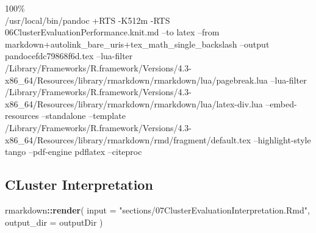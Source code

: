 \documentclass[
]{article}
\newenvironment{Shaded}{\begin{snugshade}}{\end{snugshade}}
\newcommand{\AttributeTok}[1]{\textcolor[rgb]{0.13,0.29,0.53}{#1}}
\newcommand{\FunctionTok}[1]{\textcolor[rgb]{0.13,0.29,0.53}{\textbf{#1}}}
\newcommand{\NormalTok}[1]{#1}
\newcommand{\SpecialCharTok}[1]{\textcolor[rgb]{0.81,0.36,0.00}{\textbf{#1}}}
\newcommand{\StringTok}[1]{\textcolor[rgb]{0.31,0.60,0.02}{#1}}
\begin{document}
100\%\\
/usr/local/bin/pandoc +RTS -K512m -RTS
06ClusterEvaluationPerformance.knit.md --to latex --from
markdown+autolink\_bare\_uris+tex\_math\_single\_backslash --output
pandocefdc79868f6d.tex --lua-filter
/Library/Frameworks/R.framework/Versions/4.3-x86\_64/Resources/library/rmarkdown/rmarkdown/lua/pagebreak.lua
--lua-filter
/Library/Frameworks/R.framework/Versions/4.3-x86\_64/Resources/library/rmarkdown/rmarkdown/lua/latex-div.lua
--embed-resources --standalone --template
/Library/Frameworks/R.framework/Versions/4.3-x86\_64/Resources/library/rmarkdown/rmd/fragment/default.tex
--highlight-style tango --pdf-engine pdflatex --citeproc

\hypertarget{cluster-interpretation}{%
\subsection{CLuster Interpretation}\label{cluster-interpretation}}

\begin{Shaded}
\begin{Highlighting}[]
\NormalTok{rmarkdown}\SpecialCharTok{::}\FunctionTok{render}\NormalTok{(}
  \AttributeTok{input =} \StringTok{"sections/07ClusterEvaluationInterpretation.Rmd"}\NormalTok{,}
  \AttributeTok{output\_dir =}\NormalTok{ outputDir}
\NormalTok{)}
\end{Highlighting}
\end{Shaded}
\end{document}
